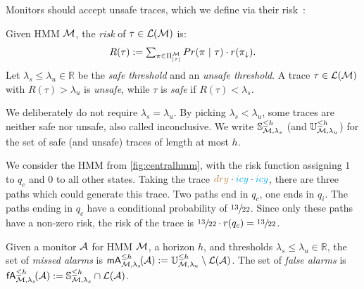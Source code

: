 \documentclass[runningheads]{llncs}
\newcommand{\Obs}{Z}
\newcommand{\icy}{{\color{cyan} icy}\xspace}
\newcommand{\dry}{{\color{brown} dry}\xspace}
\newcommand{\safetraces}[2]{\mathbb{S}_{#1}^{#2}}
\newcommand{\unsafetraces}[2]{\mathbb{U}_{#1}^{#2}}
\newcommand{\missedalarms}[2]{\mathsf{mA}_{#1}^{#2}}
\newcommand{\falsealarms}[2]{\mathsf{fA}_{#1}^{#2}}
\newcommand{\defeq}{:=}
\begin{document}
\noindent Monitors should accept unsafe traces, which we define via their risk~\cite{jungesRuntimeMonitorsMarkov2021}:
\begin{definition}\label{def:safeunsafe}
    Given HMM $\mathcal{M}$, the \emph{risk} of $\tau \in \mathcal{L}(\mathcal{M})$ is: \[\textstyle R(\tau) \defeq \sum\nolimits_{\pi\in\Pi_{|\tau|}^\mc}\Prob(\pi \ |\ \tau) \cdot r(\pi_{\downarrow}).\]
    Let $\lambda_s \leq \lambda_u \in \mathbb{R}$ be the \emph{safe threshold}  and an \emph{unsafe threshold}.
    A trace $\tau \in \mathcal{L}(\mathcal{M})$ with $R(\tau) > \lambda_u$ is \emph{unsafe}, while $\tau$ is \emph{safe} if $R(\tau) < \lambda_s$.
\end{definition}
We deliberately do not require $\lambda_s = \lambda_u$.
By picking $\lambda_s < \lambda_u$, some traces are neither safe nor unsafe, also called inconclusive.
We write $\safetraces{\mc,\lambda_s}{\leq h}$ (and $\unsafetraces{\mc,\lambda_u}{\leq h}$) for the set of safe (and unsafe) traces of length at most $h$.
\begin{example}
    We consider the HMM from \cref{fig:centralhmm}, with the risk function assigning $1$ to $q_c$ and $0$ to all other states. Taking the trace $\dry \cdot \icy \cdot \icy$, there are three paths which could generate this trace. Two paths end in $q_c$, one ends in $q_i$. The paths ending in $q_c$ have a conditional probability of $\sfrac{13}{22}$. Since only these paths have a non-zero risk, the risk of the trace is $\sfrac{13}{22} \cdot r(q_c) = \sfrac{13}{22}$.
\end{example}
\begin{definition}
    Given a monitor $\mathcal{A}$ for HMM $\mathcal{M}$, a horizon $h$, and thresholds $\lambda_s \leq \lambda_u \in \mathbb{R}$, the set of \emph{missed alarms} is $\missedalarms{\mc,\lambda_s}{\leq h}\!(\dfa) \defeq \unsafetraces{\mc,\lambda_u}{\leq h} \setminus \lang{\dfa}$. The set of \emph{false alarms} is $\falsealarms{\mc,\lambda_s}{\leq h}\!(\dfa) \defeq \safetraces{\mc,\lambda_s}{\leq h} \cap \lang{\dfa}$.
\end{definition}
\end{document}
